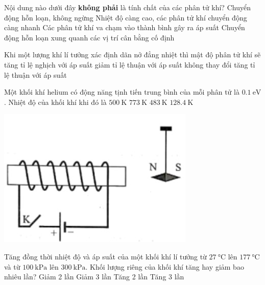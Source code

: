 \begin{ex}
Nội dung nào dưới đây \textbf{không phải} là tính chất của các phân tử khí?	
	\choice
	{Chuyển động hỗn loạn, không ngừng}
	{Nhiệt độ càng cao, các phân tử khí chuyển động càng nhanh}
	{Các phân tử khí va chạm vào thành bình gây ra áp suất}
	{Chuyển động hỗn loạn xung quanh các vị trí cân bằng cố định}
	\loigiai{}
\end{ex}
\begin{ex}
	Khi một lượng khí lí tưởng xác định dãn nở đẳng nhiệt thì mật độ phân tử khí sẽ
	\choice
	{tăng tỉ lệ nghịch với áp suất}
	{giảm tỉ lệ thuận với áp suất}
	{không thay đổi}
	{tăng tỉ lệ thuận với áp suất}
	\loigiai{}
\end{ex}
\begin{ex}
	Một khối khí helium có động năng tịnh tiến trung bình của mỗi phân tử là $\SI{0.1}{\electronvolt}$. Nhiệt độ của khối khí khi đó là
	\choice
	{$\SI{500}{\kelvin}$}
	{$\SI{773}{\kelvin}$}
	{$\SI{483}{\kelvin}$}
	{$\SI{128.4}{\kelvin}$}
	\loigiai{}
\end{ex}
\begin{ex}
		{\vspace{-0.5cm}\includegraphics[scale=0.6]{../figs/FINAL-SEM1-004-2}}
	\loigiai{}
\end{ex}
\begin{ex}
	Tăng đồng thời nhiệt độ và áp suất của một khối khí lí tưởng từ $\SI{27}{\celsius}$ lên $\SI{177}{\celsius}$ và từ $\SI{100}{\kilo\pascal}$ lên $\SI{300}{\kilo\pascal}$. Khối lượng riêng của khối khí tăng hay giảm bao nhiêu lần?
	\choice
	{Giảm 2 lần}
	{Giảm 3 lần}
	{Tăng 2 lần}
	{Tăng 3 lần}
	\loigiai{}
\end{ex}
